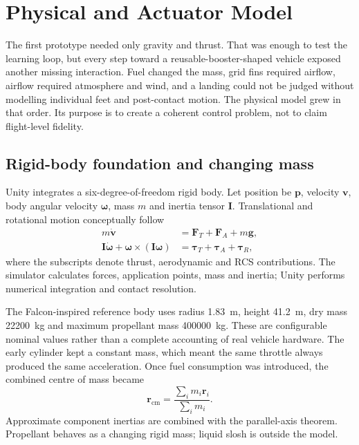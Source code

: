 \chapter{Physical and Actuator Model}
\label{ch:physics}

The first prototype needed only gravity and thrust. That was enough to test the learning loop,
but every step toward a reusable-booster-shaped vehicle exposed another missing interaction.
Fuel changed the mass, grid fins required airflow, airflow required atmosphere and wind, and a
landing could not be judged without modelling individual feet and post-contact motion. The
physical model grew in that order. Its purpose is to create a coherent control problem, not to
claim flight-level fidelity.

\section{Rigid-body foundation and changing mass}

Unity integrates a six-degree-of-freedom rigid body. Let position be $\mathbf p$, velocity
$\mathbf v$, body angular velocity $\boldsymbol\omega$, mass $m$ and inertia tensor
$\mathbf I$. Translational and rotational motion conceptually follow
\begin{align}
  m\dot{\mathbf v} &= \mathbf F_T+\mathbf F_A+m\mathbf g, \\
  \mathbf I\dot{\boldsymbol\omega}+
  \boldsymbol\omega\times(\mathbf I\boldsymbol\omega) &=
  \boldsymbol\tau_T+\boldsymbol\tau_A+\boldsymbol\tau_R,
\end{align}
where the subscripts denote thrust, aerodynamic and RCS contributions. The simulator calculates
forces, application points, mass and inertia; Unity performs numerical integration and contact
resolution.

The Falcon-inspired reference body uses radius \SI{1.83}{m}, height \SI{41.2}{m}, dry mass
\SI{22200}{kg} and maximum propellant mass \SI{400000}{kg}. These are configurable nominal
values rather than a complete accounting of real vehicle hardware. The early cylinder kept a
constant mass, which meant the same throttle always produced the same acceleration. Once fuel
consumption was introduced, the combined centre of mass became
\begin{equation}
  \mathbf r_{\mathrm{cm}}=\frac{\sum_i m_i\mathbf r_i}{\sum_i m_i}.
\end{equation}
Approximate component inertias are combined with the parallel-axis theorem. Propellant behaves
as a changing rigid mass; liquid slosh is outside the model.

